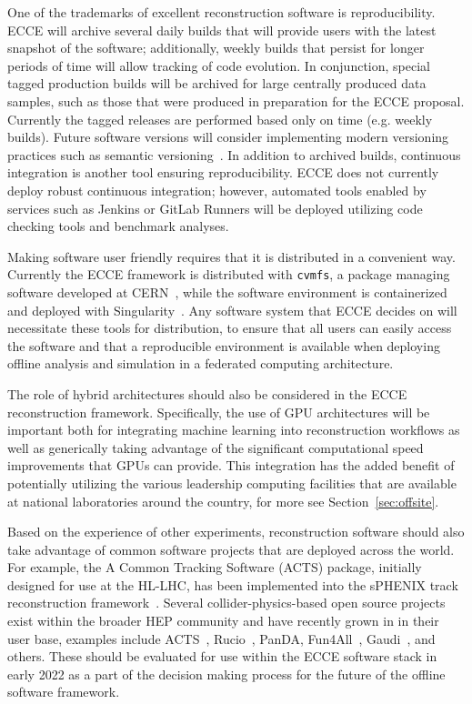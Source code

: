 One of the trademarks of excellent reconstruction software is reproducibility. ECCE will archive several daily builds that will provide users with the latest snapshot of the software; additionally, weekly builds that persist for longer periods of time will allow tracking of code evolution. In conjunction, special tagged production builds will be archived for large centrally produced data samples, such as those that were produced in preparation for the ECCE proposal. Currently the tagged releases are performed based only on time (e.g. weekly builds). Future software versions will consider implementing modern versioning practices such as semantic versioning~\cite{semantic}. In addition to archived builds, continuous integration is another tool ensuring reproducibility. ECCE does not currently deploy robust continuous integration; however, automated tools enabled by services such as Jenkins or GitLab Runners will be deployed utilizing code checking tools and benchmark analyses. 

Making software user friendly requires that it is distributed in a convenient way. Currently the ECCE framework is distributed with \texttt{cvmfs}, a package managing software developed at CERN~\cite{cernvm}, while the software environment is containerized and deployed with Singularity~\cite{singularity}. Any software system that ECCE decides on will necessitate these tools for distribution, to ensure that all users can easily access the software and that a reproducible environment is available when deploying offline analysis and simulation in a federated computing architecture.

The role of hybrid architectures should also be considered in the ECCE reconstruction framework. Specifically, the use of GPU architectures will be important both for integrating machine learning into reconstruction workflows as well as generically taking advantage of the significant computational speed improvements that GPUs can provide. This integration has the added benefit of potentially utilizing the various leadership computing facilities that are available at national laboratories around the country, for more see Section~\ref{sec:offsite}.


Based on the experience of other experiments, reconstruction software should also take advantage of common software projects that are deployed across the world. For example, the A Common Tracking Software (ACTS) package, initially designed for use at the HL-LHC, has been implemented into the sPHENIX track reconstruction framework~\cite{Osborn:2021zlr}. Several collider-physics-based open source projects exist within the broader HEP community and have recently grown in in their user base, examples include ACTS~\cite{Ai:2021ghi}, Rucio~\cite{Barisits:2019fyl}, PanDA, Fun4All~\cite{fun4allGithub}, Gaudi~\cite{Gaudi}, and others. These should be evaluated for use within the ECCE software stack in early 2022 as a part of the decision making process for the future of the offline software framework.

